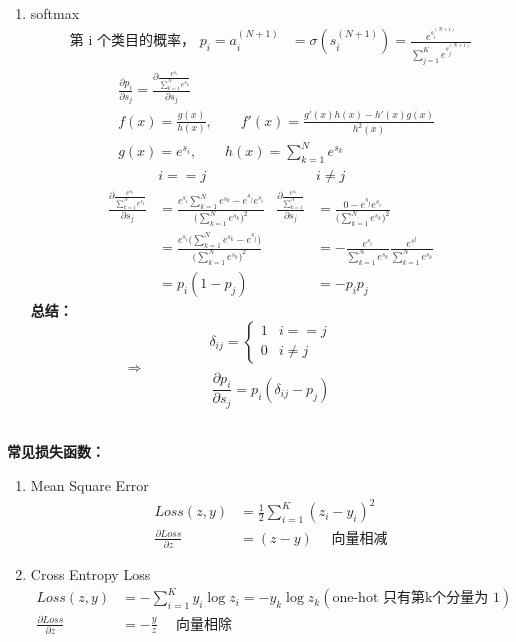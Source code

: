 \begin{enumerate}
  \item softmax
  \begin{align*}
    \text{第 i 个类目的概率， }p_i = a^{(N+1)}_i &=\sigma(s^{(N+1)}_i)= \frac{e^{s^{(N+1)}_i}}{\sum_{j=1}^{K} e^{s^{(N+1)}_j}}
  \end{align*}
\begin{align*}
  &\frac{\partial p_i}{\partial s_j}=\frac{\partial\frac{e^{s_i}}{\sum_{k=1}^{N}e^{s_k}}}{\partial s_j}\\
  &f(x) = \frac{g(x)}{h(x)},~~~~~~~~~f'(x)=\frac{g'(x)h(x)-h'(x)g(x)}{h^2(x)}\\
  &g(x)=e^{s_i},~~~~~~~~~h(x)=\sum_{k=1}^{N}e^{s_k}
\end{align*}
\begin{align*}
  &i==j&&i\neq j\\
  \frac{\partial\frac{e^{s_i}}{\sum_{k=1}^{N}e^{s_k}}}{\partial s_j}&=\frac{e^{s_i} \sum_{k=1}^{N} e^{s_k}-e^{s_j}e^{s_i}}{\big(\sum_{k=1}^{N}e^{s_k}\big)^2}&\frac{\partial\frac{e^{s_i}}{\sum_{k=1}^{N}}}{\partial s_j}&=\frac{0-e^{s_j}e^{s_i}}{\big(\sum_{k=1}^{N}e^{s_k}\big)^2}\\
  &=\frac{e^{s_i}\big(\sum_{k=1}^{N}e^{s_k}-e^{s_j}\big)}{\big(\sum_{k=1}^{N}e^{s_k}\big)^2}&&=-\frac{e^{s_i}}{\sum_{k=1}^{N}e^{s_k}}\frac{e^{s^j}}{\sum_{k=1}^{N}e^{s_k}}\\
  &=p_i(1-p_j)&&=-p_ip_j
\end{align*}
\noindent\textbf{总结：}\\
$$
\delta_{ij}=
\begin{cases}
1& i==j\\
0& i\neq j
\end{cases}
$$
$~~~~~~~~~~~~~~~~~~~~~~~~~~~~~~\Rightarrow$
$$\frac{\partial p_i}{\partial s_j}=p_i(\delta_{ij}-p_j)$$
\end{enumerate}

~\\
\noindent\textbf{常见损失函数：}
\begin{enumerate}
  \item Mean Square Error
  \begin{align*}
    Loss(z,y) &=\frac{1}{2} \sum_{i=1}^{K}(z_i-y_i)^2\\
    \frac{\partial Loss}{\partial z} & = (z-y)  ~~~~~~\text{向量相减}
  \end{align*}
  \item Cross Entropy Loss
  \begin{align*}
    Loss(z,y) &= -\sum_{i=1}^{K}y_i\log z_i=-y_k\log z_k (\text{one-hot 只有第k个分量为 1})\\
    \frac{\partial Loss}{\partial z} &=-\frac{y}{z}  ~~~~~~\text{向量相除}
  \end{align*}
\end{enumerate}
~\\

